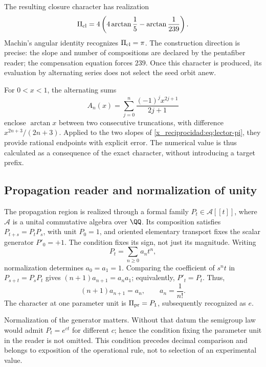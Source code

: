 The resulting closure character has realization
\begin{equation}
 \Pi_{\rm cl}=4\left(4\arctan\frac15-\arctan\frac1{239}\right).
 \label{x_reciprocidad:eq:lector-pi}
\end{equation}
Machin's angular identity recognizes \(\Pi_{\rm cl}=\pi\). The construction direction is precise: the slope and number of compositions are declared by the pentafiber reader; the compensation equation forces \(239\). Once this character is produced, its evaluation by alternating series does not select the seed orbit anew.

For \(0<x<1\), the alternating sums
\[
 A_n(x)=\sum_{j=0}^n\frac{(-1)^jx^{2j+1}}{2j+1}
\]
enclose \(\arctan x\) between two consecutive truncations, with difference \(x^{2n+3}/(2n+3)\). Applied to the two slopes of \eqref{x_reciprocidad:eq:lector-pi}, they provide rational endpoints with explicit error. The numerical value is thus calculated as a consequence of the exact character, without introducing a target prefix.

\subsection{Propagation reader and normalization of unity}

The propagation region is realized through a formal family \(P_t\in\mathcal A[[t]]\), where \(\mathcal A\) is a unital commutative algebra over \(\QQ\). Its composition satisfies \(P_{t+s}=P_tP_s\), with unit \(P_0=1\), and oriented elementary transport fixes the scalar generator \(P'_0=+1\). The condition fixes its sign, not just its magnitude. Writing
\[
 P_t=\sum_{n\ge0}a_nt^n,
\]
normalization determines \(a_0=a_1=1\). Comparing the coefficient of \(s^nt\) in \(P_{s+t}=P_sP_t\) gives \((n+1)a_{n+1}=a_na_1\); equivalently, \(P'_t=P_t\). Thus,
\begin{equation}
 (n+1)a_{n+1}=a_n,\qquad a_n=\frac1{n!}.
 \label{x_reciprocidad:eq:propagacion}
\end{equation}
The character at one parameter unit is \(\Pi_{\rm pr}=P_1\), subsequently recognized as \(e\).

Normalization of the generator matters. Without that datum the semigroup law would admit \(P_t=e^{ct}\) for different \(c\); hence the condition fixing the parameter unit in the reader is not omitted. This condition precedes decimal comparison and belongs to exposition of the operational rule, not to selection of an experimental value.

